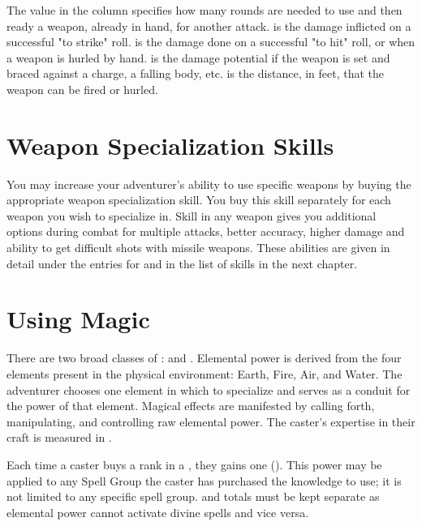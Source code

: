 \begin{multicols*}{2}
The value in the  column specifies how many rounds are needed to use and then ready a weapon, already in hand, for another attack.  is the damage inflicted on a successful "to strike" roll.  is the damage done on a successful "to hit" roll, or when a weapon is hurled by hand.  is the damage potential if the weapon is set and braced against a charge, a falling body, etc.  is the distance, in feet, that the weapon can be fired or hurled.
\end{multicols*}


\setlength{\columnsep}{\defcolwidth}
\begin{multicols*}{2}
\section{Weapon Specialization Skills}
You may increase your adventurer's ability to use specific weapons by buying the appropriate weapon specialization skill. You buy this skill separately for each weapon you wish to specialize in. Skill in any weapon gives you additional options during combat for multiple attacks, better accuracy, higher damage and ability to get difficult shots with missile weapons. These abilities are given in detail under the entries for  and  in the list of skills in the next chapter.
\section{Using Magic}
There are two broad classes of :  and . Elemental power is derived from the four elements present in the physical environment: Earth, Fire, Air, and Water. The adventurer chooses one element in which to specialize and serves as a conduit for the power of that element. Magical effects are manifested by calling forth, manipulating, and controlling raw elemental power. The caster's expertise in their craft is measured in .

Each time a caster buys a rank in a , they gains one  (\EU). This power may be applied to any Spell Group the caster has purchased the knowledge to use; it is not limited to any specific spell group.   and  totals must be kept separate as elemental power cannot activate divine spells and vice versa.


\end{multicols*}
